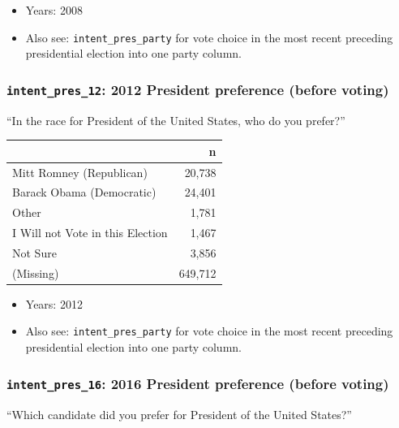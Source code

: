 \documentclass[10pt,article,oneside]{memoir}
\begin{document}
\begin{itemize}
\tightlist
\item
  Years: 2008
\item
  Also see: \texttt{intent\_pres\_party} for vote choice in the most
  recent preceding presidential election into one party column.
\end{itemize}

\subsubsection{\texorpdfstring{\texttt{intent\_pres\_12}: 2012 President
preference (before
voting)}{intent\_pres\_12: 2012 President preference (before voting)}}\label{intent_pres_12-2012-president-preference-before-voting}

``In the race for President of the United States, who do you prefer?''

\begin{table}[H]
\centering
\begin{tabular}[t]{lr}
\toprule
 & n\\
\midrule
Mitt Romney (Republican) & 20,738\\
Barack Obama (Democratic) & 24,401\\
Other & 1,781\\
I Will not Vote in this Election & 1,467\\
Not Sure & 3,856\\
(Missing) & 649,712\\
\bottomrule
\end{tabular}
\end{table}

\begin{itemize}
\tightlist
\item
  Years: 2012
\item
  Also see: \texttt{intent\_pres\_party} for vote choice in the most
  recent preceding presidential election into one party column.
\end{itemize}

\subsubsection{\texorpdfstring{\texttt{intent\_pres\_16}: 2016 President
preference (before
voting)}{intent\_pres\_16: 2016 President preference (before voting)}}\label{intent_pres_16-2016-president-preference-before-voting}

``Which candidate did you prefer for President of the United States?''
\end{document}
